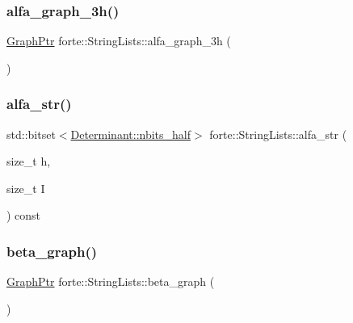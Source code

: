 \mbox{\label{classforte_1_1_string_lists_a8f7724f157b07db86a26838b41523480}} 
\subsubsection{\texorpdfstring{alfa\+\_\+graph\+\_\+3h()}{alfa\_graph\_3h()}}
{\footnotesize\ttfamily \mbox{\hyperlink{namespaceforte_a4669cbddcd761bcaee151bc7cff6c444}{Graph\+Ptr}} forte\+::\+String\+Lists\+::alfa\+\_\+graph\+\_\+3h (\begin{DoxyParamCaption}{ }\end{DoxyParamCaption})\hspace{0.3cm}{\ttfamily [inline]}}

\mbox{\label{classforte_1_1_string_lists_ad42bebe13677b64473716efed3dbbc3a}} 
\subsubsection{\texorpdfstring{alfa\+\_\+str()}{alfa\_str()}}
{\footnotesize\ttfamily std\+::bitset$<$\mbox{\hyperlink{classforte_1_1_determinant_impl_ac8d2a64c2fb785ccb79b1cecc553d63d}{Determinant\+::nbits\+\_\+half}}$>$ forte\+::\+String\+Lists\+::alfa\+\_\+str (\begin{DoxyParamCaption}\item[{size\+\_\+t}]{h,  }\item[{size\+\_\+t}]{I }\end{DoxyParamCaption}) const\hspace{0.3cm}{\ttfamily [inline]}}

\mbox{\label{classforte_1_1_string_lists_afb67086a8188199389fd53fc091ac31a}} 
\subsubsection{\texorpdfstring{beta\+\_\+graph()}{beta\_graph()}}
{\footnotesize\ttfamily \mbox{\hyperlink{namespaceforte_a4669cbddcd761bcaee151bc7cff6c444}{Graph\+Ptr}} forte\+::\+String\+Lists\+::beta\+\_\+graph (\begin{DoxyParamCaption}{ }\end{DoxyParamCaption})\hspace{0.3cm}{\ttfamily [inline]}}

